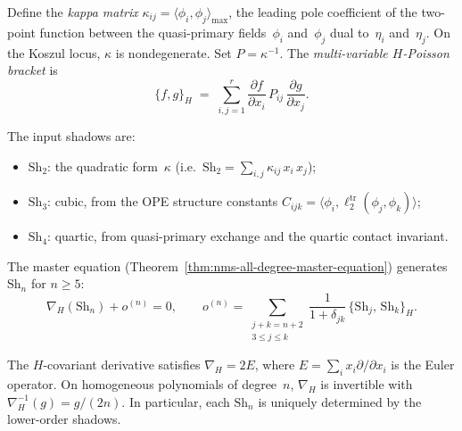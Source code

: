 \begin{definition}
\label{def:nms-kappa-matrix}%
%
%
Define the \emph{kappa matrix}
$\kappa_{ij} = \langle \phi_i, \phi_j \rangle_{\max}$, the leading
pole coefficient of the two-point function between the quasi-primary
fields~$\phi_i$ and~$\phi_j$ dual to~$\eta_i$ and~$\eta_j$. On the
Koszul locus, $\kappa$ is nondegenerate. Set $P = \kappa^{-1}$.
The \emph{multi-variable $H$-Poisson bracket} is
\begin{equation}\label{eq:nms-multivariable-h-poisson}
\{f, g\}_H
\;=\;
\sum_{i,j=1}^{r}
\frac{\partial f}{\partial x_i}\,
P_{ij}\,
\frac{\partial g}{\partial x_j}.
\end{equation}
\end{definition}

The input shadows are:
\begin{itemize}
\item $\mathrm{Sh}_2$: the quadratic form~$\kappa$ (i.e.\
 $\mathrm{Sh}_2 = \sum_{i,j} \kappa_{ij}\, x_i\, x_j$);
\item $\mathrm{Sh}_3$: cubic, from the OPE structure constants
 $C_{ijk} = \langle \phi_i, \ell_2^{\mathrm{tr}}(\phi_j, \phi_k)
 \rangle$;
\item $\mathrm{Sh}_4$: quartic, from quasi-primary exchange and the
 quartic contact invariant.
\end{itemize}
The master equation
(Theorem~\ref{thm:nms-all-degree-master-equation}) generates
$\mathrm{Sh}_n$ for $n \geq 5$:
\begin{equation}\label{eq:nms-multivariable-master-equation}
\nabla_H(\mathrm{Sh}_n) + o^{(n)} = 0,
\qquad
o^{(n)}
= \sum_{\substack{j+k=n+2 \\ 3 \leq j \leq k}}
 \frac{1}{1+\delta_{jk}}\,
 \{\mathrm{Sh}_j,\, \mathrm{Sh}_k\}_H.
\end{equation}

\begin{lemma}
\label{lem:nms-euler-inversion}%
%
The $H$-covariant derivative satisfies $\nabla_H = 2E$, where
$E = \sum_{i} x_i \partial/\partial x_i$ is the Euler operator.
On homogeneous polynomials of degree~$n$, $\nabla_H$ is invertible
with $\nabla_H^{-1}(g) = g/(2n)$. In particular, each $\mathrm{Sh}_n$
is uniquely determined by the lower-order shadows.
\end{lemma}

